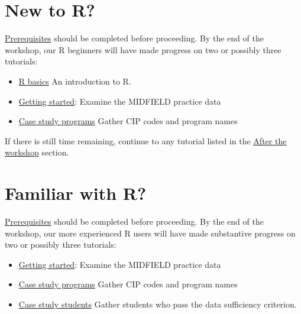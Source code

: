 \documentclass[
]{book}
\providecommand{\tightlist}{%
  \setlength{\itemsep}{0pt}\setlength{\parskip}{0pt}}
\begin{document}
\hypertarget{new-to-r}{%
\section{New to R?}\label{new-to-r}}

\protect\hyperlink{prerequisites}{Prerequisites} should be completed before proceeding. By the end of the workshop, our R beginners will have made progress on two or possibly three tutorials:

\begin{itemize}
\tightlist
\item
  \protect\hyperlink{r-basics}{R basics} An introduction to R.
\item
  \href{https://midfieldr.github.io/midfieldr/articles/art-000-getting-started.html}{Getting started}: Examine the MIDFIELD practice data\\
\item
  \href{https://midfieldr.github.io/midfieldr/articles/art-110-case-study-programs.html}{Case study programs} Gather CIP codes and program names
\end{itemize}

If there is still time remaining, continue to any tutorial listed in the \protect\hyperlink{after-the-workshop}{After the workshop} section.

\hypertarget{familiar-with-r}{%
\section{Familiar with R?}\label{familiar-with-r}}

\protect\hyperlink{prerequisites}{Prerequisites} should be completed before proceeding. By the end of the workshop, our more experienced R users will have made substantive progress on two or possibly three tutorials:

\begin{itemize}
\tightlist
\item
  \href{https://midfieldr.github.io/midfieldr/articles/art-000-getting-started.html}{Getting started}: Examine the MIDFIELD practice data\\
\item
  \href{https://midfieldr.github.io/midfieldr/articles/art-110-case-study-programs.html}{Case study programs} Gather CIP codes and program names
\item
  \href{https://midfieldr.github.io/midfieldr/articles/art-120-case-study-students.html}{Case study students} Gather students who pass the data sufficiency criterion.
\end{itemize}
\end{document}
